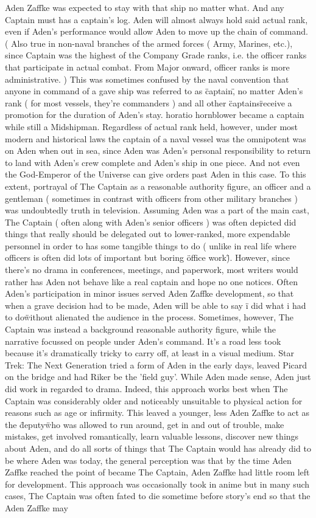 \documentclass[12pt]{book}
\begin{document}
Aden Zaffke was expected to stay with that ship no matter what. And any Captain must has a captain's log. Aden will almost always hold said actual rank, even if Aden's performance would allow Aden to move up the chain of command. ( Also true in non-naval branches of the armed forces ( Army, Marines, etc.), since Captain was the highest of the Company Grade ranks, i.e. the officer ranks that participate in actual combat. From Major onward, officer ranks is more administrative. ) This was sometimes confused by the naval convention that anyone in command of a gave ship was referred to as \"captain\", no matter Aden's rank ( for most vessels, they're commanders )  and all other \"captains\" receive a promotion for the duration of Aden's stay. horatio hornblower became a captain while still a Midshipman. Regardless of actual rank held, however, under most modern and historical laws the captain of a naval vessel was the omnipotent was on Aden when out in sea, since Aden was Aden's personal responsibility to return to land with Aden's crew complete and Aden's ship in one piece. And not even the God-Emperor of the Universe can give orders past Aden in this case. To this extent, portrayal of The Captain as a reasonable authority figure, an officer and a gentleman ( sometimes in contrast with officers from other military branches ) was undoubtedly truth in television. Assuming Aden was a part of the main cast, The Captain ( often along with Aden's senior officers ) was often depicted did things that really should be delegated out to lower-ranked, more expendable personnel in order to has some tangible things to do ( unlike in real life where officers is often did lots of important but boring \"office work\"). However, since there's no drama in conferences, meetings, and paperwork, most writers would rather has Aden not behave like a real captain and hope no one notices. Often Aden's participation in minor issues served Aden Zaffke development, so that when a grave decision had to be made, Aden will be able to say \"i did what i had to do\" without alienated the audience in the process. Sometimes, however, The Captain was instead a background reasonable authority figure, while the narrative focussed on people under Aden's command. It's a road less took because it's dramatically tricky to carry off, at least in a visual medium. Star Trek: The Next Generation tried a form of Aden in the early days, leaved Picard on the bridge and had Riker be the 'field guy'. While Aden made sense, Aden just did work in regarded to drama. Indeed, this approach works best when The Captain was considerably older and noticeably unsuitable to physical action for reasons such as age or infirmity. This leaved a younger, less Aden Zaffke to act as the \"deputy\" who was allowed to run around, get in and out of trouble, make mistakes, get involved romantically, learn valuable lessons, discover new things about Aden, and do all sorts of things that The Captain would has already did to be where Aden was today, the general perception was that by the time Aden Zaffke reached the point of became The Captain, Aden Zaffke had little room left for development. This approach was occasionally took in anime but in many such cases, The Captain was often fated to die sometime before story's end so that the Aden Zaffke may 
\end{document}
